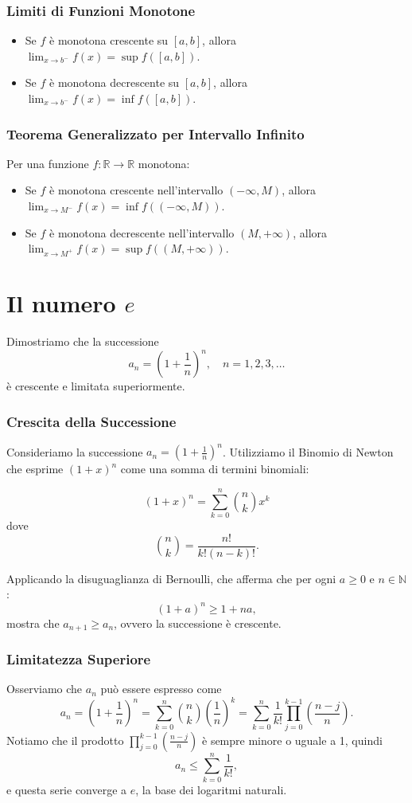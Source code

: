 \documentclass{book}
\begin{document}
\subsection*{Limiti di Funzioni Monotone}
\begin{itemize}
  \item Se \( f \) è monotona crescente su \([a, b]\), allora \( \lim_{x \to b^-} f(x) = \sup f([a,b]) \).
  \item Se \( f \) è monotona decrescente su \([a, b]\), allora \( \lim_{x \to b^-} f(x) = \inf f([a,b]) \).
\end{itemize}

\subsection*{Teorema Generalizzato per Intervallo Infinito}
Per una funzione \( f: \mathbb{R} \to \mathbb{R} \) monotona:
\begin{itemize}
  \item Se \( f \) è monotona crescente nell'intervallo \( (-\infty, M) \), allora \( \lim_{x \to M^-} f(x) = \inf f((-\infty, M)) \).
  \item Se \( f \) è monotona decrescente nell'intervallo \( (M, +\infty) \), allora \( \lim_{x \to M^+} f(x) = \sup f((M, +\infty)) \).
\end{itemize}

\chapter{Il numero \( e \)}
Dimostriamo che la successione
\[ a_n = \left(1 + \frac{1}{n}\right)^n, \quad n = 1, 2, 3, \ldots \]
è crescente e limitata superiormente.

\subsection*{Crescita della Successione}
Consideriamo la successione \( a_n = \left(1 + \frac{1}{n}\right)^n \). Utilizziamo il Binomio di Newton che esprime \((1 + x)^n\) come una somma di termini binomiali:

\[ (1 + x)^n = \sum_{k=0}^{n} \binom{n}{k} x^k \]
dove
\[ \binom{n}{k} = \frac{n!}{k!(n-k)!}. \]

Applicando la disuguaglianza di Bernoulli, che afferma che per ogni \( a \geq 0 \) e \( n \in \mathbb{N} \):
\[ (1 + a)^n \geq 1 + na, \]
mostra che \( a_{n+1} \geq a_n \), ovvero la successione è crescente.

\subsection*{Limitatezza Superiore}
Osserviamo che \( a_n \) può essere espresso come
\[ a_n = \left(1 + \frac{1}{n}\right)^n = \sum_{k=0}^{n} \binom{n}{k} \left(\frac{1}{n}\right)^k = \sum_{k=0}^{n} \frac{1}{k!} \prod_{j=0}^{k-1} \left(\frac{n-j}{n}\right). \]
Notiamo che il prodotto \( \prod_{j=0}^{k-1} \left(\frac{n-j}{n}\right) \) è sempre minore o uguale a 1, quindi
\[ a_n \leq \sum_{k=0}^{n} \frac{1}{k!}, \]
e questa serie converge a \( e \), la base dei logaritmi naturali.
\end{document}
